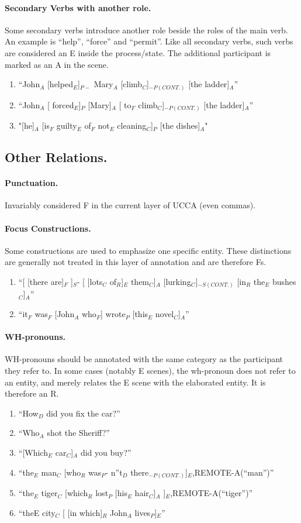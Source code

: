 \documentclass[11pt]{article}
\newcommand{\be}{\begin{enumerate}}
\newcommand{\ee}{\end{enumerate}}
\begin{document}
\paragraph{
Secondary Verbs with another role.}
Some secondary verbs introduce another role beside the roles of the main verb. An example is ``help'', ``force'' and ``permit''. Like all secondary verbs, such verbs are considered an E inside the process/state. The additional participant is marked as an A in the scene.
\be \item
``John$_A$ [helped$_E$]$_{P-}$ Mary$_A$ [climb$_C$]$_{-P(CONT.)}$ [the ladder]$_A$''
\item
``John$_A$ [ forced$_E$]$_P$ [Mary]$_A$ [ to$_F$ climb$_C$]$_{-P(CONT.)}$ [the ladder]$_A$''
\item
"[he]$_A$ [is$_F$ guilty$_E$ of$_F$ not$_E$ cleaning$_C$]$_P$ [the dishes]$_A$"
\ee



\subsection*{Other Relations.}

\paragraph{
Punctuation.} Invariably considered F in the current layer of UCCA (even commas).

\paragraph{
Focus Constructions.} Some constructions are used to emphasize one specific entity. These distinctions are generally not treated in this layer of annotation and are therefore Fs.
\be
\item
``[ [there are]$_F$ ]$_S$- [ [lots$_C$ of$_R$]$_E$ them$_C$]$_A$ [lurking$_C$]$_{-S(CONT.)}$ [in$_R$ the$_E$ bushes$_C$]$_A$''
\item
``it$_F$ was$_F$  [John$_A$ who$_F$] wrote$_P$ [this$_E$ novel$_C$]$_A$''
\ee

\paragraph{
WH-pronouns.} WH-pronouns should be annotated with the same category as the participant they refer to. In some cases (notably E scenes), the wh-pronoun does not refer to an entity, and merely relates the E scene with the elaborated entity. It is therefore an R.
\be \item
``How$_D$ did you fix the car?''
\item
``Who$_A$ shot the Sheriff?''
\item
``[Which$_E$ car$_C$]$_A$ did you buy?''
\item
``the$_E$ man$_C$ [who$_R$ was$_P$- n''t$_D$ there$_{-P(CONT.)}$]$_E$,REMOTE-A(``man'')''
\item
``the$_E$ tiger$_C$ [which$_R$ lost$_P$ [his$_E$ hair$_C$]$_A$ ]$_E$,REMOTE-A(``tiger'')''
\item
``the­E city$_C$ [ [in which]$_R$ John$_A$ lives$_P$]$_E$''
\ee
\end{document}
